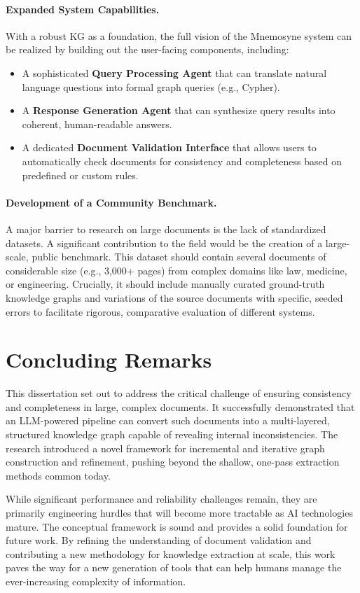 \paragraph{Expanded System Capabilities.}
With a robust KG as a foundation, the full vision of the Mnemosyne system can be realized by building out the user-facing components, including:
\begin{itemize}
    \item A sophisticated \textbf{Query Processing Agent} that can translate natural language questions into formal graph queries (e.g., Cypher).
    \item A \textbf{Response Generation Agent} that can synthesize query results into coherent, human-readable answers.
    \item A dedicated \textbf{Document Validation Interface} that allows users to automatically check documents for consistency and completeness based on predefined or custom rules.
\end{itemize}

\paragraph{Development of a Community Benchmark.}
A major barrier to research on large documents is the lack of standardized datasets. A significant contribution to the field would be the creation of a large-scale, public benchmark. This dataset should contain several documents of considerable size (e.g., 3,000+ pages) from complex domains like law, medicine, or engineering. Crucially, it should include manually curated ground-truth knowledge graphs and variations of the source documents with specific, seeded errors to facilitate rigorous, comparative evaluation of different systems.

\section{Concluding Remarks}
\label{sec:conclusion}
This dissertation set out to address the critical challenge of ensuring consistency and completeness in large, complex documents. It successfully demonstrated that an LLM-powered pipeline can convert such documents into a multi-layered, structured knowledge graph capable of revealing internal inconsistencies. The research introduced a novel framework for incremental and iterative graph construction and refinement, pushing beyond the shallow, one-pass extraction methods common today.

While significant performance and reliability challenges remain, they are primarily engineering hurdles that will become more tractable as AI technologies mature. The conceptual framework is sound and provides a solid foundation for future work. By refining the understanding of document validation and contributing a new methodology for knowledge extraction at scale, this work paves the way for a new generation of tools that can help humans manage the ever-increasing complexity of information.
